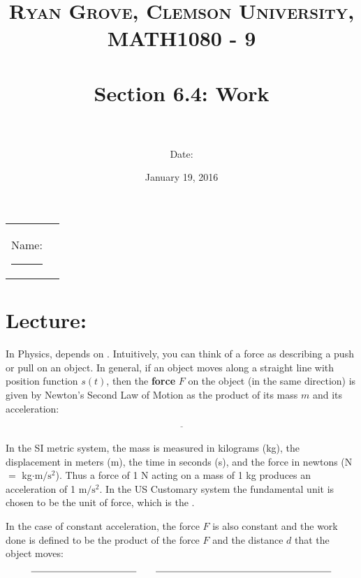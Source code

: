 \documentclass[paper=a4, fontsize=11pt]{scrartcl} %
\title{	
\normalfont \normalsize 
\textsc{Ryan Grove, Clemson University, MATH1080 - 9} \\ [25pt] %
\horrule{0.5pt} \\[0.4cm] %
\huge Section 6.4: Work  \\ %
\horrule{2pt} \\[0.5cm] %
}
\author{Date:} %
\date{\normalsize January 19, 2016} %
\numberwithin{equation}{section} %
\numberwithin{figure}{section} %
\numberwithin{table}{section} %
\begin{document}
\maketitle %

\begin{flushleft}
\begin{tabular}{l l}
Name: \rule{3.2in}{.01cm}  & {}%
\end{tabular}
\end{flushleft}


\section*{\textbf{Lecture:}}

In Physics, \underline{\hspace{1in}} depends on \underline{\hspace{1in}}. Intuitively, you can think of a force as describing a push or pull on an object. In general, if an object moves along a straight line with position function $s(t)$, then the \textbf{force} $F$ on the object (in the same direction) is given by Newton's Second Law of Motion as the product of its mass $m$ and its acceleration:\\
\indent


\[\underline{\hspace{2in}}\]
\indent\\

In the SI metric system, the mass is measured in kilograms (kg), the displacement in meters (m), the time in seconds (s), and the force in newtons (N$=$ kg$\cdot$m$/\text{s}^2$). Thus a force of 1 N acting on a mass of 1 kg produces an acceleration of 1 m$/\text{s}^2$. In the US Customary system the fundamental unit is chosen to be the unit of force, which is the \underline{\hspace{1.25in}}.\\
\indent

In the case of constant acceleration, the force $F$ is also constant and the work done is defined to be the product of the force $F$ and the distance $d$ that the object moves:\\
\indent

\[\underline{\hspace{1.5in}} \quad \quad \underline{\hspace{2.5in}}\]
\indent\\
\end{document}
